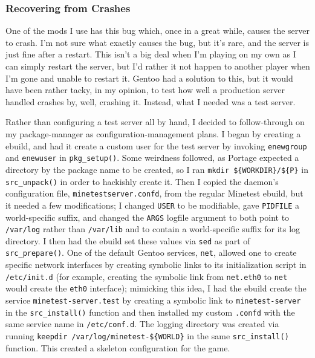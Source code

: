 \documentclass{article}
\begin{document}
\subsubsection{Recovering from Crashes}
One of the mods I use has this bug which, once in a great while, causes the server to crash.  I'm not sure what exactly causes the bug, but it's rare, and the server is just fine after a restart.  This isn't a big deal when I'm playing on my own as I can simply restart the server, but I'd rather it not happen to another player when I'm gone and unable to restart it.  Gentoo had a solution to this, but it would have been rather tacky, in my opinion, to test how well a production server handled crashes by, well, crashing it.  Instead, what I needed was a test server.

Rather than configuring a test server all by hand, I decided to follow-through on my package-manager as configuration-management plans.  I began by creating a  ebuild, and had it create a custom user for the test server by invoking \texttt{enewgroup} and \texttt{enewuser} in \texttt{pkg_setup()}.  Some weirdness followed, as Portage expected a directory by the package name to be created, so I ran \verb|mkdir ${WORKDIR}/${P}| in \texttt{src_unpack()} in order to hackishly create it.  Then I copied the daemon's configuration file, \texttt{minetestserver.confd}, from the regular Minetest ebuild, but it needed a few modifications; I changed \texttt{USER} to be modifiable, gave \texttt{PIDFILE} a world-specific suffix, and changed the \texttt{ARGS} logfile argument to both point to \texttt{/var/log} rather than \texttt{/var/lib} and to contain a world-specific suffix for its log directory.  I then had the ebuild set these values via \texttt{sed} as part of \texttt{src_prepare()}.  One of the default Gentoo services, \texttt{net}, allowed one to create specific network interfaces by creating symbolic links to its initialization script in \texttt{/etc/init.d} (for example, creating the symbolic link from \texttt{net.eth0} to \texttt{net} would create the \texttt{eth0} interface); mimicking this idea, I had the ebuild create the service \texttt{minetest-server.test} by creating a symbolic link to \texttt{minetest-server} in the \texttt{src_install()} function and then installed my custom \texttt{.confd} with the same service name in \texttt{/etc/conf.d}.  The logging directory was created via running \verb|keepdir /var/log/minetest-${WORLD}| in the same \texttt{src_install()} function.  This created a skeleton configuration for the game.
\end{document}
